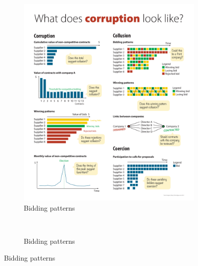 \begin{figure}[H]
\begin{subfigure}[t]{0.5\textwidth}
\end{subfigure}

\end{figure}
\clearpage
\begin{figure}[H]
\ContinuedFloat

\begin{subfigure}[t]{0.5\textwidth}
\caption{Bidding patterns}
\includegraphics[max width=1\textwidth]{../img/poster_coercion.pdf}
\end{subfigure}
~
\begin{subfigure}[t]{0.5\textwidth}
\caption{Bidding patterns}

\end{subfigure}
\end{figure}
